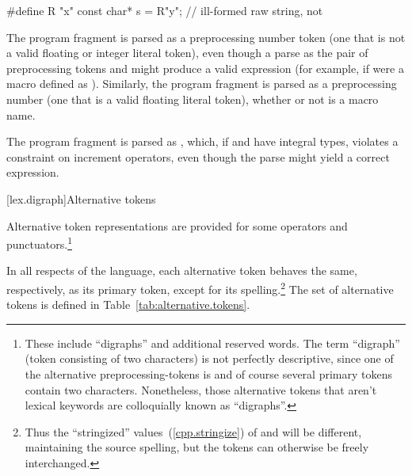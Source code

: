 \enterexample
\begin{codeblock}
#define R "x"
const char* s = R"y";           // ill-formed raw string, not 
\end{codeblock}
\exitexample

\pnum
\enterexample The program fragment  is parsed as a
preprocessing number token (one that is not a valid floating or integer
literal token), even though a parse as the pair of preprocessing tokens
 and  might produce a valid expression (for example,
if  were a macro defined as ). Similarly, the
program fragment  is parsed as a preprocessing number (one
that is a valid floating literal token), whether or not  is a
macro name. \exitexample

\pnum
\enterexample The program fragment  is parsed as , which, if  and  have integral types,
violates a constraint on increment operators, even though the parse
 might yield a correct expression. \exitexample%

[lex.digraph]{Alternative tokens}

\pnum
{}%
Alternative token representations are provided for some operators and
punctuators.\footnote{%
These include ``digraphs'' and additional reserved words. The term
``digraph'' (token consisting of two characters) is not perfectly
descriptive, since one of the alternative preprocessing-tokens is
\tcode{\%:\%:} and of course several primary tokens contain two
characters. Nonetheless, those alternative tokens that aren't lexical
keywords are colloquially known as ``digraphs''. }

\pnum
In all respects of the language, each alternative token behaves the
same, respectively, as its primary token, except for its spelling.\footnote{Thus the ``stringized'' values~(\ref{cpp.stringize}) of
\tcode{[} and \tcode{<:} will be different, maintaining the source
spelling, but the tokens can otherwise be freely interchanged. }
The set of alternative tokens is defined in
Table~\ref{tab:alternative.tokens}.


